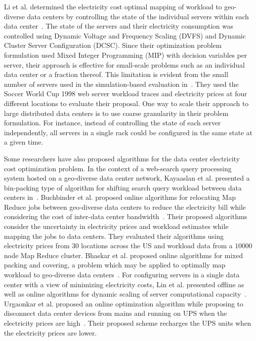 Li et al. determined the electricity cost optimal mapping of workload to geo-diverse data centers by controlling the state of the individual servers within each data center~\cite{Li:Optimal:TSG:2012}. The state of the servers and their electricity consumption was controlled using Dynamic Voltage and Frequency Scaling (DVFS) and Dynamic Cluster Server Configuration (DCSC). Since their optimization problem formulation used Mixed Integer Programming (MIP) with decision variables per server, their approach is effective for small-scale problems such as an individual data center or a fraction thereof. This limitation is evident from the small number of servers used in the simulation-based evaluation in~\cite{Li:Optimal:TSG:2012}. They used the Soccer World Cup 1998 web server workload traces and electricity prices at four different locations to evaluate their proposal. One way to scale their approach to large distributed data centers is to use coarse granularity in their problem formulation. For instance, instead of controlling the state of each server independently, all servers in a single rack could be configured in the same state at a given time. 

Some researchers have also proposed algorithms for the data center electricity cost optimization problem. In the context of a web-search query processing system hosted on a geo-diverse data center network, Kayaaslan et al. presented a bin-packing type of algorithm for shifting search query workload between data centers in~\cite{Kayaaslan:2011:EQP:2009916.2010047}. Buchbinder et al. proposed online algorithms for relocating Map Reduce jobs between geo-diverse data centers to reduce the electricity bill while considering the cost of inter-data center bandwidth~\cite{Buchbinder:2011:OJR:2008780.2008798}. Their proposed algorithms consider the uncertainty in electricity prices and workload estimates while mapping the jobs to data centers. They evaluated their algorithms using electricity prices from $30$ locations across the US and workload data from a $10000$ node Map Reduce cluster. Bhaskar et al. proposed online algorithms for mixed packing and covering, a problem which may be applied to optimally map workload to geo-diverse data centers~\cite{Bhaskar:2012:CoRR}. For configuring servers in a single data center with a view of minimizing electricity costs, Lin et al. presented offline as well as online algorithms for dynamic scaling of server computational capacity~\cite{LinInfocom11}. Urgaonkar et al. proposed an online optimization algorithm while proposing to disconnect data center devices from mains and running on UPS when the electricity prices are high~\cite{Urgaonkar:2011:OPC:1993744.1993766}. Their proposed scheme recharges the UPS units when the electricity prices are lower.

